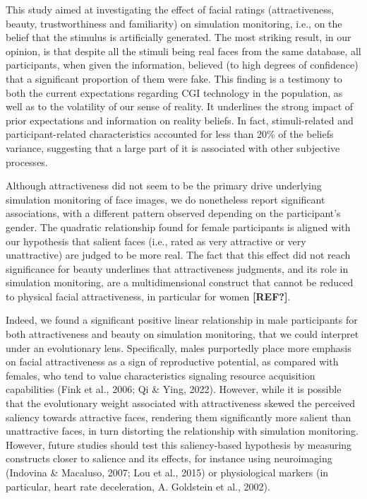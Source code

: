 \documentclass[
  man,floatsintext]{apa6}
\begin{document}
This study aimed at investigating the effect of facial ratings (attractiveness, beauty, trustworthiness and familiarity) on simulation monitoring, i.e., on the belief that the stimulus is artificially generated. The most striking result, in our opinion, is that despite all the stimuli being real faces from the same database, all participants, when given the information, believed (to high degrees of confidence) that a significant proportion of them were fake. This finding is a testimony to both the current expectations regarding CGI technology in the population, as well as to the volatility of our sense of reality. It underlines the strong impact of prior expectations and information on reality beliefs. In fact, stimuli-related and participant-related characteristics accounted for less than 20\% of the beliefs variance, suggesting that a large part of it is associated with other subjective processes.

Although attractiveness did not seem to be the primary drive underlying simulation monitoring of face images, we do nonetheless report significant associations, with a different pattern observed depending on the participant's gender. The quadratic relationship found for female participants is aligned with our hypothesis that salient faces (i.e., rated as very attractive or very unattractive) are judged to be more real. The fact that this effect did not reach significance for beauty underlines that attractiveness judgments, and its role in simulation monitoring, are a multidimensional construct that cannot be reduced to physical facial attractiveness, in particular for women \textbf{{[}REF?{]}}.

Indeed, we found a significant positive linear relationship in male participants for both attractiveness and beauty on simulation monitoring, that we could interpret under an evolutionary lens. Specifically, males purportedly place more emphasis on facial attractiveness as a sign of reproductive potential, as compared with females, who tend to value characteristics signaling resource acquisition capabilities (Fink et al., 2006; Qi \& Ying, 2022). However, while it is possible that the evolutionary weight associated with attractiveness skewed the perceived saliency towards attractive faces, rendering them significantly more salient than unattractive faces, in turn distorting the relationship with simulation monitoring. However, future studies should test this saliency-based hypothesis by measuring constructs closer to salience and its effects, for instance using neuroimaging (Indovina \& Macaluso, 2007; Lou et al., 2015) or physiological markers (in particular, heart rate deceleration, A. Goldstein et al., 2002).
\end{document}
